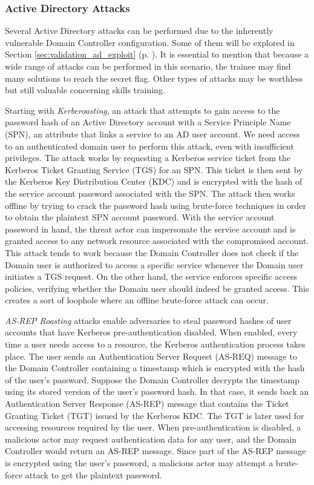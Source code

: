 \subsubsection{Active Directory Attacks} \label{sec:validation_ad_attacks}

Several Active Directory attacks can be performed due to the inherently vulnerable Domain Controller configuration. Some of them will be explored in Section \ref{sec:validation_ad_exploit} (p. \pageref{sec:validation_ad_exploit}). It is essential to mention that because a wide range of attacks can be performed in this scenario, the trainee may find many solutions to reach the secret flag. Other types of attacks may be worthless but still valuable concerning skills training.

Starting with \textit{Kerberoasting}, an attack that attempts to gain access to the password hash of an Active Directory account with a Service Principle Name (SPN), an attribute that links a service to an AD user account. We need access to an authenticated domain user to perform this attack, even with insufficient privileges. The attack works by requesting a Kerberos service ticket from the Kerberos Ticket Granting Service (TGS) for an SPN. This ticket is then sent by the Kerberos Key Distribution Center (KDC) and is encrypted with the hash of the service account password associated with the SPN. The attack then works offline by trying to crack the password hash using brute-force techniques in order to obtain the plaintext SPN account password. With the service account password in hand, the threat actor can impersonate the service account and is granted access to any network resource associated with the compromised account. This attack tends to work because the Domain Controller does not check if the Domain user is authorized to access a specific service whenever the Domain user initiates a TGS request. On the other hand, the service enforces specific access policies, verifying whether the Domain user should indeed be granted access. This creates a sort of loophole where an offline brute-force attack can occur.

\textit{AS-REP Roasting} attacks enable adversaries to steal password hashes of user accounts that have Kerberos pre-authentication disabled. When enabled, every time a user needs access to a resource, the Kerberos authentication process takes place. The user sends an Authentication Server Request (AS-REQ) message to the Domain Controller containing a timestamp which is encrypted with the hash of the user's password. Suppose the Domain Controller decrypts the timestamp using its stored version of the user's password hash. In that case, it sends back an Authentication Server Response (AS-REP) message that contains the Ticket Granting Ticket (TGT) issued by the Kerberos KDC. The TGT is later used for accessing resources required by the user. When pre-authentication is disabled, a malicious actor may request authentication data for any user, and the Domain Controller would return an AS-REP message. Since part of the AS-REP message is encrypted using the user's password, a malicious actor may attempt a brute-force attack to get the plaintext password. 

